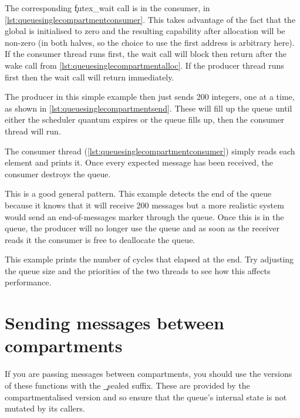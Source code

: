 The corresponding \c{futex_wait} call is in the consumer, in \ref{lst:queuesinglecompartmentconsumer}.
This takes advantage of the fact that the global is initialised to zero and the resulting capability after allocation will be non-zero (in both halves, so the choice to use the first address is arbitrary here).
If the consumer thread runs first, the wait call will block then return after the wake call from \ref{lst:queuesinglecompartmentalloc}.
If the producer thread runs first then the wait call will return immediately.

The producer in this simple example then just sends 200 integers, one at a time, as shown in \ref{lst:queuesinglecompartmentsend}.
These will fill up the queue until either the scheduler quantum expires or the queue fills up, then the consumer thread will run.

\codelisting[filename=examples/producer_consumer/queue.cc,marker=queue_send,label=lst:queuesinglecompartmentsend,caption="Sending messages to a message queue."]{}

The consumer thread (\ref{lst:queuesinglecompartmentconsumer}) simply reads each element and prints it.
Once every expected message has been received, the consumer destroys the queue.

This is a good general pattern.
This example detects the end of the queue because it knows that it will receive 200 messages but a more realistic system would send an end-of-messages marker through the queue.
Once this is in the queue, the producer will no longer use the queue and as soon as the receiver reads it the consumer is free to deallocate the queue.

\codelisting[filename=examples/producer_consumer/queue.cc,marker=consumer,label=lst:queuesinglecompartmentconsumer,caption="Receiving messages from a message queue."]{}

This example prints the number of cycles that elapsed at the end.
Try adjusting the queue size and the priorities of the two threads to see how this affects performance.

\section{Sending messages between compartments}

If you are passing messages between compartments, you should use the versions of these functions with the \c{_sealed} suffix.
These are provided by the compartmentalised version and so ensure that the queue's internal state is not mutated by its callers.

